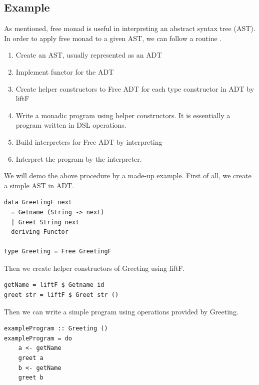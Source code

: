 \subsection{Example} \label{b:fm:e}
As mentioned, free monad is useful in interpreting an abstract syntax tree (AST). In order to apply free monad to a given AST, we can follow a routine \cite{contributorsCatsFreeMonads}.
\begin{enumerate}
  \item Create an AST, usually represented as an ADT
  \item Implement functor for the ADT
  \item Create helper constructors to Free ADT for each type constructor in ADT by liftF 
  \item Write a monadic program using helper constructors. It is essentially a program written in DSL operations.
  \item Build interpreters for Free ADT by interpreting
  \item Interpret the program by the interpreter.
\end{enumerate}
We will demo the above procedure by a made-up example. First of all, we create a simple AST in ADT. 
\begin{code}
\begin{verbatim}
data GreetingF next
  = Getname (String -> next)
  | Greet String next
  deriving Functor

type Greeting = Free GreetingF
\end{verbatim}
\end{code}
Then we create helper constructors of Greeting using liftF.
\begin{verbatim}
getName = liftF $ Getname id
greet str = liftF $ Greet str ()
\end{verbatim}
Then we can write a simple program using operations provided by Greeting.
\begin{verbatim}
exampleProgram :: Greeting ()
exampleProgram = do
    a <- getName
    greet a
    b <- getName
    greet b
\end{verbatim}
